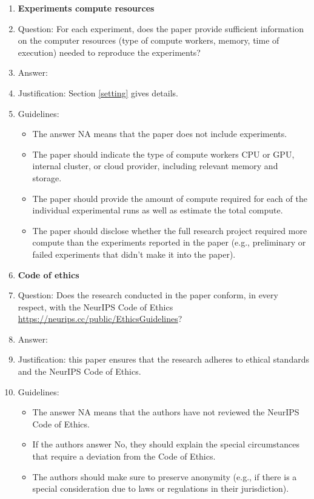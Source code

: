 \documentclass{article}
\begin{document}
\begin{enumerate}
\item {\bf Experiments compute resources}
    \item[] Question: For each experiment, does the paper provide sufficient information on the computer resources (type of compute workers, memory, time of execution) needed to reproduce the experiments?
    \item[] Answer: \answerYes{} %
    \item[] Justification: Section \ref{setting} gives details.
    \item[] Guidelines:
    \begin{itemize}
        \item The answer NA means that the paper does not include experiments.
        \item The paper should indicate the type of compute workers CPU or GPU, internal cluster, or cloud provider, including relevant memory and storage.
        \item The paper should provide the amount of compute required for each of the individual experimental runs as well as estimate the total compute. 
        \item The paper should disclose whether the full research project required more compute than the experiments reported in the paper (e.g., preliminary or failed experiments that didn't make it into the paper). 
    \end{itemize}
    
\item {\bf Code of ethics}
    \item[] Question: Does the research conducted in the paper conform, in every respect, with the NeurIPS Code of Ethics \url{https://neurips.cc/public/EthicsGuidelines}?
    \item[] Answer: \answerYes{} %
    \item[] Justification: this paper ensures that the research adheres to ethical standards and the NeurIPS Code of Ethics.
    \item[] Guidelines:
    \begin{itemize}
        \item The answer NA means that the authors have not reviewed the NeurIPS Code of Ethics.
        \item If the authors answer No, they should explain the special circumstances that require a deviation from the Code of Ethics.
        \item The authors should make sure to preserve anonymity (e.g., if there is a special consideration due to laws or regulations in their jurisdiction).
    \end{itemize}



\end{enumerate}
\end{document}
